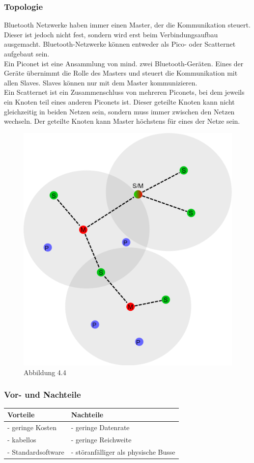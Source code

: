 \subsubsection{Topologie}
Bluetooth Netzwerke haben immer einen Master, der die Kommunikation steuert. Dieser ist jedoch nicht fest, sondern wird erst beim Verbindungsaufbau ausgemacht.
Bluetooth-Netzwerke können entweder als Pico- oder Scatternet aufgebaut sein.
\\                                                                                  
Ein Piconet ist eine Ansammlung von mind. zwei Bluetooth-Geräten. Eines der Geräte übernimmt die Rolle des Masters und steuert die Kommunikation mit allen Slaves. Slaves können nur mit dem Master kommunizieren.
\\                                                                                  Ein Scatternet ist ein Zusammenschluss von mehreren Piconets, bei dem jeweils ein Knoten teil eines anderen Piconets ist. Dieser geteilte Knoten kann nicht gleichzeitig in beiden Netzen sein, sondern muss immer zwischen den Netzen wechseln. Der geteilte Knoten kann Master höchstens für eines der Netze sein.
\\
\begin{figure}[h!]
	\includegraphics[width=0.7\linewidth]{pico_scatternet.png}
	\caption{Abbildung 4.4}
\end{figure}

\subsubsection{Vor- und Nachteile}
\begin{tabular}{l|l}
	Vorteile & Nachteile\\
	\hline - geringe Kosten & - geringe Datenrate\\
	\hline - kabellos & - geringe Reichweite\\
	\hline - Standardsoftware & - störanfälliger als physische Busse\\
\end{tabular}